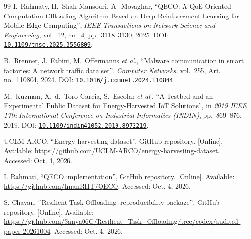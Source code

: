 \documentclass[conference]{IEEEtran}
\begin{document}
\begin{thebibliography}{99}
 I.~Rahmaty, H.~Shah-Mansouri, A.~Movaghar, ``QECO: A QoE-Oriented Computation Offloading Algorithm Based on Deep Reinforcement Learning for Mobile Edge Computing'', \emph{IEEE Transactions on Network Science and Engineering}, vol.~12, no.~4, pp.~3118--3130, 2025. DOI: \href{https://doi.org/10.1109/tnse.2025.3556809}{\nolinkurl{10.1109/tnse.2025.3556809}}.

 B.~Brenner, J.~Fabini, M.~Offermanns \emph{et al.}, ``Malware communication in smart factories: A network traffic data set'', \emph{Computer Networks}, vol.~255, Art. no.~110804, 2024. DOI: \href{https://doi.org/10.1016/j.comnet.2024.110804}{\nolinkurl{10.1016/j.comnet.2024.110804}}.

 M.~Kuzman, X.~d.~Toro Garcia, S.~Escolar \emph{et al.}, ``A Testbed and an Experimental Public Dataset for Energy-Harvested IoT Solutions'', in \emph{2019 IEEE 17th International Conference on Industrial Informatics (INDIN)}, pp.~869--876, 2019. DOI: \href{https://doi.org/10.1109/indin41052.2019.8972219}{\nolinkurl{10.1109/indin41052.2019.8972219}}.

 UCLM-ARCO, ``Energy-harvesting dataset'', GitHub repository. [Online]. Available: \url{https://github.com/UCLM-ARCO/energy-harvesting-dataset}. Accessed: Oct. 4, 2026.

 I. Rahmati, ``QECO implementation'', GitHub repository. [Online]. Available: \url{https://github.com/ImanRHT/QECO}. Accessed: Oct. 4, 2026.

 S. Chavan, ``Resilient Task Offloading: reproducibility package'', GitHub repository. [Online]. Available: \url{https://github.com/Sanya06C/Resilient_Task_Offloading/tree/codex/audited-paper-20261004}. Accessed: Oct. 4, 2026.
\end{thebibliography}
\end{document}
